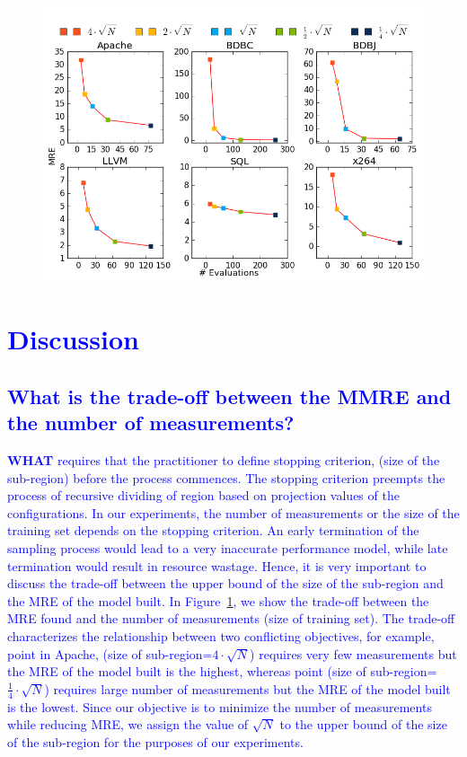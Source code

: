 \documentclass[smallextended]{svjour3}       %
\newcommand{\what}{{\bf WHAT}\xspace}
\begin{document}

\begin{figure}[t]
\includegraphics[width=\columnwidth]{Figures/param_tuning}
\caption{}
\label{fig:param_tuning}
\end{figure}


\section{\textcolor{blue}{Discussion}}
\subsection{\textcolor{blue}{What is the trade-off between the MMRE and the number of measurements?}}
\textcolor{blue}{\what{} requires that the practitioner to define stopping criterion, (size of the sub-region) before the
process commences.
The stopping criterion preempts the process of recursive dividing of region
based on projection values of the configurations. In our experiments, the
number of measurements or the size of the training set depends
on the stopping criterion. An early termination of the
sampling process would lead to a very inaccurate performance model, while
late termination would result in resource wastage. Hence, it is very
important to discuss the trade-off between the upper bound of the size of the sub-region and
the MRE of the model built. In Figure~\ref{fig:param_tuning}, we show the trade-off
between the MRE found and the number
of measurements (size of training set). The trade-off characterizes
the relationship between two conflicting objectives, for example,
point in Apache, (size of sub-region=$4\cdot \sqrt{N}$) requires very few measurements but the MRE of the model built is the highest, whereas point (size of sub-region=$\frac{1}{4}\cdot \sqrt{N}$) requires large
number of measurements but the MRE of the model built is the lowest. Since
our objective is to minimize the number of measurements while
reducing MRE, we assign the value of $\sqrt{N}$ to the upper bound of the size of the sub-region for the
purposes of our experiments.}
\end{document}
